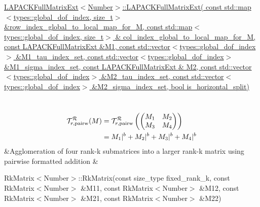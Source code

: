 \begin{longtabu}
\begin{DoxyItemize}
\item \hyperlink{classLAPACKFullMatrixExt_a1c8c9c59c2edc349031c4867c19067ef}{L\+A\+P\+A\+C\+K\+Full\+Matrix\+Ext$<$\+Number$>$\+::\+L\+A\+P\+A\+C\+K\+Full\+Matrix\+Ext( const std\+::map$<$types\+::global\+\_\+dof\+\_\+index, size\+\_\+t$>$ \&row\+\_\+index\+\_\+global\+\_\+to\+\_\+local\+\_\+map\+\_\+for\+\_\+\+M, const std\+::map$<$types\+::global\+\_\+dof\+\_\+index, size\+\_\+t$>$ \& col\+\_\+index\+\_\+global\+\_\+to\+\_\+local\+\_\+map\+\_\+for\+\_\+\+M, const L\+A\+P\+A\+C\+K\+Full\+Matrix\+Ext \&\+M1, const std\+::vector$<$types\+::global\+\_\+dof\+\_\+index$>$ \&\+M1\+\_\+tau\+\_\+index\+\_\+set, const std\+::vector$<$types\+::global\+\_\+dof\+\_\+index$>$ \&\+M1\+\_\+sigma\+\_\+index\+\_\+set, const L\+A\+P\+A\+C\+K\+Full\+Matrix\+Ext \& M2, const std\+::vector$<$types\+::global\+\_\+dof\+\_\+index$>$ \&\+M2\+\_\+tau\+\_\+index\+\_\+set, const std\+::vector$<$types\+::global\+\_\+dof\+\_\+index$>$ \&\+M2\+\_\+sigma\+\_\+index\+\_\+set, bool is\+\_\+horizontal\+\_\+split)}
\end{DoxyItemize}\\
\[\begin{aligned}\mathcal{T}_{r, {\rm pairw}}^{\mathcal{R}}(M) &= \mathcal{T}_{r, {\rm pairw}}^{\mathcal{R}}\left(\begin{pmatrix} M_1 & M_2 \\ M_3 & M_4 \end{pmatrix}\right) \\ &= M_1\vert^b + M_2\vert^b + M_3\vert^b + M_4\vert^b\end{aligned}\] &Agglomeration of four rank-\/k submatrices into a larger rank-\/k matrix using pairwise formatted addition &
\begin{DoxyItemize}
\item Rk\+Matrix$<$\+Number$>$\+::\+Rk\+Matrix(const size\+\_\+type fixed\+\_\+rank\+\_\+k, const Rk\+Matrix$<$\+Number$>$ \&\+M11, const Rk\+Matrix$<$\+Number$>$ \&\+M12, const Rk\+Matrix$<$\+Number$>$ \&\+M21, const Rk\+Matrix$<$\+Number$>$ \&\+M22)

\end{DoxyItemize}
\end{longtabu}
